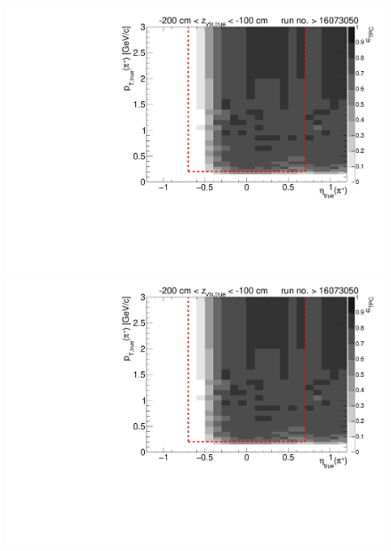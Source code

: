 \begin{figure}[hb]
{		\includegraphics[width=\linewidth,page=16]{graphics/eff/Eff2D_TPC_pion_Plus_RunRange2.pdf}\\
		\includegraphics[width=\linewidth,page=18]{graphics/eff/Eff2D_TPC_pion_Plus_RunRange2.pdf}
	}%
\end{figure}


